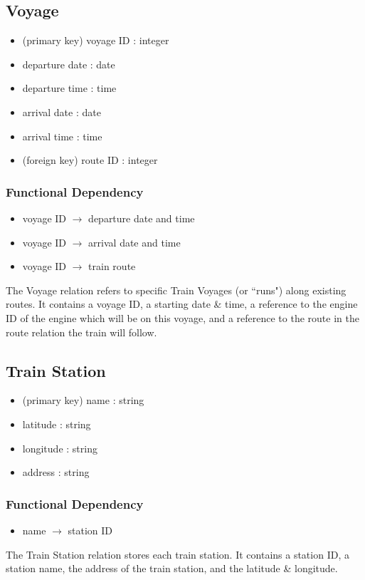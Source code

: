 \documentclass[a4paper]{article}
\begin{document}
\subsection*{Voyage}
\begin{itemize}
\item (primary key) voyage ID : integer
\item departure date : date
\item departure time : time
\item arrival date : date
\item arrival time : time
\item (foreign key) route ID : integer
\end{itemize}
\subsubsection*{Functional Dependency}
\begin{itemize}
\item voyage ID $\rightarrow$ departure date and time 
\item voyage ID $\rightarrow$ arrival date and time 
\item voyage ID $\rightarrow$ train route
\end{itemize}
The Voyage relation refers to specific Train Voyages (or ``runs") along existing routes. It contains a voyage ID, a starting date \& time, a reference to the engine ID of the engine which will be on this voyage, and a reference to the route in the route relation the train will follow.

\subsection*{Train Station}
\begin{itemize}
\item (primary key) name : string
\item latitude : string
\item longitude : string
\item address : string
\end{itemize}
\subsubsection*{Functional Dependency}
\begin{itemize}
\item name $\rightarrow$ station ID
\end{itemize}
The Train Station relation stores each train station. It contains a station ID, a station name, the address of the train station, and the latitude \& longitude.
\end{document}
